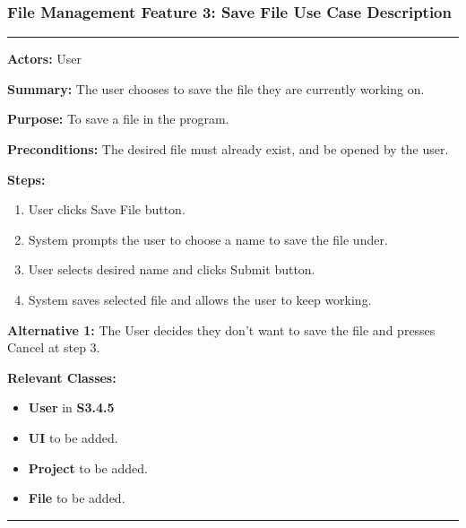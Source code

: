 \documentclass[twoside,letterpaper]{article}
\begin{document}
\newpage

\subsubsection[File Management Feature 3: Save File Use Case Description]{\rmfamily\bfseries\color{black}
	File Management Feature 3: Save File Use Case Description}
\hypertarget{RefHeading22059017292}{}

\vspace{2pt}
\hrule
\vspace{8pt}
\textbf{Actors:} User \newline

\noindent\textbf{Summary:} The user chooses to save the file they are currently working on. \newline

\noindent\textbf{Purpose:} To save a file in the program. \newline

\noindent\textbf{Preconditions:} The desired file must already exist, and be opened by the user. \newline

\noindent\textbf{Steps:} \begin{enumerate}
	\item User clicks Save File button.
	\item System prompts the user to choose a name to save the file under.
	\item User selects desired name and clicks Submit button.
	\item System saves selected file and allows the user to keep working.

\end{enumerate}
\noindent\textbf{Alternative 1:} The User decides they don't want to save the file and presses Cancel at step 3. \newline

\noindent\textbf{Relevant Classes:}
\begin{itemize}
	\item \textbf{User} in \textbf{S3.4.5}
	\item \textbf{UI} to be added.
	\item \textbf{Project} to be added.
	\item \textbf{File} to be added.
\end{itemize}
\vspace{8pt}
\hrule

\newpage
\end{document}
